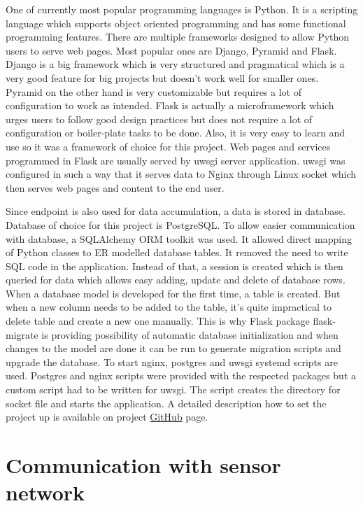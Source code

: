 One of currently most popular programming languages is Python. It is a scripting language which supports object oriented programming and has some functional programming features. There are multiple frameworks designed to allow Python users to serve web pages. Most popular ones are Django, Pyramid and Flask. Django is a big framework which is very structured and pragmatical which is a very good feature for big projects but doesn't work well for smaller ones. Pyramid on the other hand is very customizable but requires a lot of configuration to work as intended. Flask is actually a microframework which urges users to follow good design practices but does not require a lot of configuration or boiler-plate tasks to be done. Also, it is very easy to learn and use so it was a framework of choice for this project\cite{flask}. Web pages and services programmed in Flask are usually served by uwsgi server application. uwsgi was configured in such a way that it serves data to Nginx through Linux socket which then serves web pages and content to the end user.

Since endpoint is also used for data accumulation, a data is stored in database. Database of choice for this project is PostgreSQL\cite{postgres}. To allow easier communication with database, a SQLAlchemy \ac{ORM} toolkit was used. It allowed direct mapping of Python classes to ER modelled database tables. It removed the need to write SQL code in the application. Instead of that, a session is created which is then queried for data which allows easy adding, update and delete of database rows. When a database model is developed for the first time, a table is created. But when a new column needs to be added to the table, it's quite impractical to delete table and create a new one manually. This is why Flask package flask-migrate is providing possibility of automatic database initialization and when changes to the model are done it can be run to generate migration scripts and upgrade the database. To start nginx, postgres and uwsgi systemd scripts are used. Postgres and nginx scripts were provided with the respected packages but a custom script had to be written for uwsgi. The script creates the directory for socket file and starts the application. A detailed description how to set the project up is available on project \href{github.com/Xenosb/thesis-edison}{GitHub} page.


\section{Communication with sensor network}

